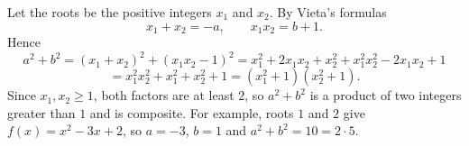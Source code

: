 Let the roots be the positive integers $x_1$ and $x_2$. By Vieta's formulas
\[
x_1+x_2=-a,\qquad x_1x_2=b+1 .
\]
Hence
\[
a^2+b^2=(x_1+x_2)^2+(x_1x_2-1)^2=x_1^2+2x_1x_2+x_2^2+x_1^2x_2^2-2x_1x_2+1
\]
\[
=x_1^2x_2^2+x_1^2+x_2^2+1=\boxed{\left(x_1^2+1\right)\left(x_2^2+1\right)}.
\]
Since $x_1,x_2\ge1$, both factors are at least $2$, so $a^2+b^2$ is a product of two integers greater than $1$ and is composite. For example, roots $1$ and $2$ give $f(x)=x^2-3x+2$, so $a=-3$, $b=1$ and $a^2+b^2=10=2\cdot5$.
